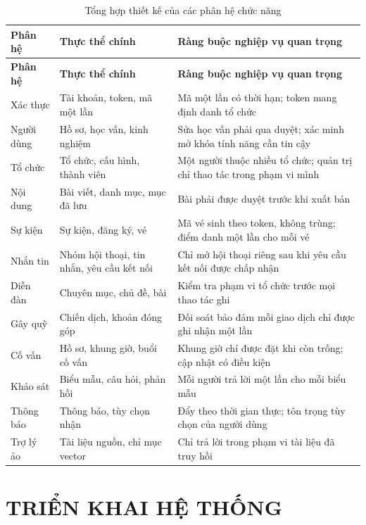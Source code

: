 \documentclass[12pt,a4paper,oneside]{report}
\begin{document}
\renewcommand{\arraystretch}{1.2}
\begin{longtable}{|>{\raggedright\arraybackslash}p{2.8cm}|>{\raggedright\arraybackslash}p{4.6cm}|>{\raggedright\arraybackslash}p{7.1cm}|}
\caption{Tổng hợp thiết kế của các phân hệ chức năng}\label{tab:subsystems}\\
\hline \textbf{Phân hệ} & \textbf{Thực thể chính} & \textbf{Ràng buộc nghiệp vụ quan trọng} \\ \hline
\endfirsthead
\hline \textbf{Phân hệ} & \textbf{Thực thể chính} & \textbf{Ràng buộc nghiệp vụ quan trọng} \\ \hline
\endhead
Xác thực & Tài khoản, token, mã một lần & Mã một lần có thời hạn; token mang định danh tổ chức \\ \hline
Người dùng & Hồ sơ, học vấn, kinh nghiệm & Sửa học vấn phải qua duyệt; xác minh mở khóa tính năng cần tin cậy \\ \hline
Tổ chức & Tổ chức, cấu hình, thành viên & Một người thuộc nhiều tổ chức; quản trị chỉ thao tác trong phạm vi mình \\ \hline
Nội dung & Bài viết, danh mục, mục đã lưu & Bài phải được duyệt trước khi xuất bản \\ \hline
Sự kiện & Sự kiện, đăng ký, vé & Mã vé sinh theo token, không trùng; điểm danh một lần cho mỗi vé \\ \hline
Nhắn tin & Nhóm hội thoại, tin nhắn, yêu cầu kết nối & Chỉ mở hội thoại riêng sau khi yêu cầu kết nối được chấp nhận \\ \hline
Diễn đàn & Chuyên mục, chủ đề, bài & Kiểm tra phạm vi tổ chức trước mọi thao tác ghi \\ \hline
Gây quỹ & Chiến dịch, khoản đóng góp & Đối soát bảo đảm mỗi giao dịch chỉ được ghi nhận một lần \\ \hline
Cố vấn & Hồ sơ, khung giờ, buổi cố vấn & Khung giờ chỉ được đặt khi còn trống; cập nhật có điều kiện \\ \hline
Khảo sát & Biểu mẫu, câu hỏi, phản hồi & Mỗi người trả lời một lần cho mỗi biểu mẫu \\ \hline
Thông báo & Thông báo, tùy chọn nhận & Đẩy theo thời gian thực; tôn trọng tùy chọn của người dùng \\ \hline
Trợ lý ảo & Tài liệu nguồn, chỉ mục vector & Chỉ trả lời trong phạm vi tài liệu đã truy hồi \\ \hline
\end{longtable}
\renewcommand{\arraystretch}{1}

\chapter{TRIỂN KHAI HỆ THỐNG}
\end{document}
